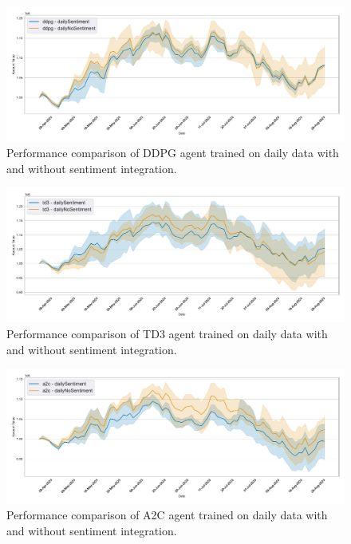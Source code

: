 \documentclass[12pt]{article}
\begin{document}
\begin{figure}[h]
\centering
\includegraphics[width=1\textwidth]{figs/Models_comparison/Sentiment/Compare_agent_performance_dailySentiment_ddpg.pdf}
\caption{Performance comparison of DDPG agent trained on daily data with and without sentiment integration.}
\label{fig:Compare_agent_performance_dailySentiment_ddpg}
\end{figure}

\begin{figure}[h]
\centering
\includegraphics[width=1\textwidth]{figs/Models_comparison/Sentiment/Compare_agent_performance_dailySentiment_td3.pdf}
\caption{Performance comparison of TD3 agent trained on daily data with and without sentiment integration.}
\label{fig:Compare_agent_performance_dailySentiment_td3}
\end{figure}

\begin{figure}[h]
\centering
\includegraphics[width=1\textwidth]{figs/Models_comparison/Sentiment/Compare_agent_performance_dailySentiment_a2c.pdf}
\caption{Performance comparison of A2C agent trained on daily data with and without sentiment integration.}
\label{fig:Compare_agent_performance_dailySentiment_a2c}
\end{figure}
\end{document}
